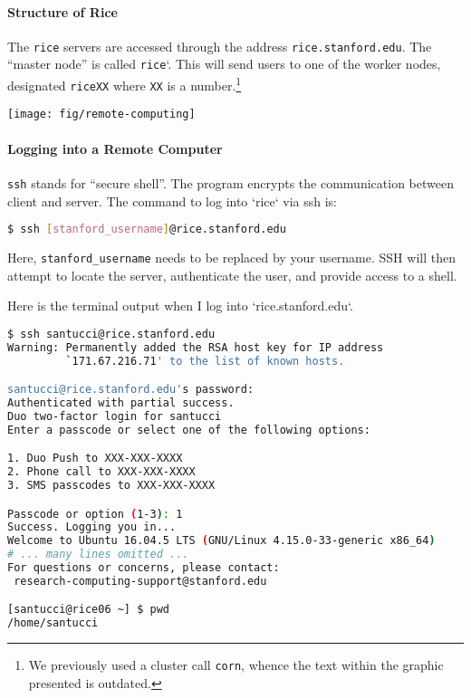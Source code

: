 \documentclass[12pt,letterpaper,twoside]{article}
\begin{document}
\paragraph{Structure of Rice}
The \texttt{rice} servers are accessed through the address \texttt{rice.stanford.edu}.  The
``master node'' is called \texttt{rice}`.  This will send users to one of the worker
nodes, designated \texttt{riceXX} where \texttt{XX} is a number.\footnote{We previously used 
a cluster call \texttt{corn}, whence the text within the graphic presented is outdated.}

\begin{center}
  \centering
  \texttt{[image: fig/remote-computing]}
\end{center}

\paragraph{Logging into a Remote Computer}
\texttt{ssh} stands for ``secure shell''.  The program encrypts the communication between
client and server.  The command to log into `rice` via ssh is:

\begin{lstlisting}[language=bash]
$ ssh [stanford_username]@rice.stanford.edu
\end{lstlisting}

Here, \texttt{stanford\_username} needs to be replaced by your username.  SSH will
then attempt to locate the server, authenticate the user, and provide access
to a shell.

Here is the terminal output when I log into `rice.stanford.edu`.

{
  \footnotesize
\begin{lstlisting}[language=bash]
$ ssh santucci@rice.stanford.edu
Warning: Permanently added the RSA host key for IP address
         `171.67.216.71' to the list of known hosts.

santucci@rice.stanford.edu's password:
Authenticated with partial success.
Duo two-factor login for santucci
Enter a passcode or select one of the following options:

1. Duo Push to XXX-XXX-XXXX
2. Phone call to XXX-XXX-XXXX
3. SMS passcodes to XXX-XXX-XXXX

Passcode or option (1-3): 1
Success. Logging you in...
Welcome to Ubuntu 16.04.5 LTS (GNU/Linux 4.15.0-33-generic x86_64)
# ... many lines omitted ...
For questions or concerns, please contact:
 research-computing-support@stanford.edu

[santucci@rice06 ~] $ pwd
/home/santucci
\end{lstlisting}
}
\end{document}
